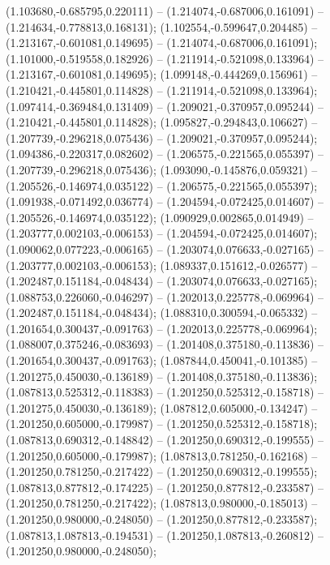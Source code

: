 (1.103680,-0.685795,0.220111) -- (1.214074,-0.687006,0.161091) -- (1.214634,-0.778813,0.168131);
 (1.102554,-0.599647,0.204485) -- (1.213167,-0.601081,0.149695) -- (1.214074,-0.687006,0.161091);
 (1.101000,-0.519558,0.182926) -- (1.211914,-0.521098,0.133964) -- (1.213167,-0.601081,0.149695);
 (1.099148,-0.444269,0.156961) -- (1.210421,-0.445801,0.114828) -- (1.211914,-0.521098,0.133964);
 (1.097414,-0.369484,0.131409) -- (1.209021,-0.370957,0.095244) -- (1.210421,-0.445801,0.114828);
 (1.095827,-0.294843,0.106627) -- (1.207739,-0.296218,0.075436) -- (1.209021,-0.370957,0.095244);
 (1.094386,-0.220317,0.082602) -- (1.206575,-0.221565,0.055397) -- (1.207739,-0.296218,0.075436);
 (1.093090,-0.145876,0.059321) -- (1.205526,-0.146974,0.035122) -- (1.206575,-0.221565,0.055397);
 (1.091938,-0.071492,0.036774) -- (1.204594,-0.072425,0.014607) -- (1.205526,-0.146974,0.035122);
 (1.090929,0.002865,0.014949) -- (1.203777,0.002103,-0.006153) -- (1.204594,-0.072425,0.014607);
 (1.090062,0.077223,-0.006165) -- (1.203074,0.076633,-0.027165) -- (1.203777,0.002103,-0.006153);
 (1.089337,0.151612,-0.026577) -- (1.202487,0.151184,-0.048434) -- (1.203074,0.076633,-0.027165);
 (1.088753,0.226060,-0.046297) -- (1.202013,0.225778,-0.069964) -- (1.202487,0.151184,-0.048434);
 (1.088310,0.300594,-0.065332) -- (1.201654,0.300437,-0.091763) -- (1.202013,0.225778,-0.069964);
 (1.088007,0.375246,-0.083693) -- (1.201408,0.375180,-0.113836) -- (1.201654,0.300437,-0.091763);
 (1.087844,0.450041,-0.101385) -- (1.201275,0.450030,-0.136189) -- (1.201408,0.375180,-0.113836);
 (1.087813,0.525312,-0.118383) -- (1.201250,0.525312,-0.158718) -- (1.201275,0.450030,-0.136189);
 (1.087812,0.605000,-0.134247) -- (1.201250,0.605000,-0.179987) -- (1.201250,0.525312,-0.158718);
 (1.087813,0.690312,-0.148842) -- (1.201250,0.690312,-0.199555) -- (1.201250,0.605000,-0.179987);
 (1.087813,0.781250,-0.162168) -- (1.201250,0.781250,-0.217422) -- (1.201250,0.690312,-0.199555);
 (1.087813,0.877812,-0.174225) -- (1.201250,0.877812,-0.233587) -- (1.201250,0.781250,-0.217422);
 (1.087813,0.980000,-0.185013) -- (1.201250,0.980000,-0.248050) -- (1.201250,0.877812,-0.233587);
 (1.087813,1.087813,-0.194531) -- (1.201250,1.087813,-0.260812) -- (1.201250,0.980000,-0.248050);
